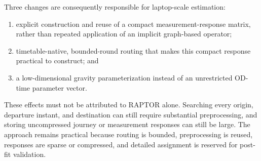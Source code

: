 Three changes are consequently responsible for laptop-scale estimation:
\begin{enumerate}
  \item explicit construction and reuse of a compact measurement-response
        matrix, rather than repeated application of an implicit graph-based
        operator;
  \item timetable-native, bounded-round routing that makes this compact
        response practical to construct; and
  \item a low-dimensional gravity parameterization instead of an unrestricted
        OD-time parameter vector.
\end{enumerate}
These effects must not be attributed to RAPTOR alone. Searching every origin,
departure instant, and destination can still require substantial preprocessing,
and storing uncompressed journey or measurement responses can still be large.
The approach remains practical because routing is bounded, preprocessing is
reused, responses are sparse or compressed, and detailed assignment is reserved
for post-fit validation.
